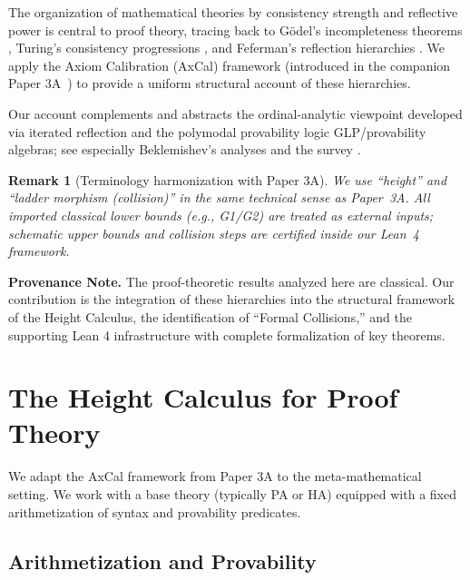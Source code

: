 \documentclass[11pt]{article}
\newtheorem{remark}[theorem]{Remark}
\begin{document}
The organization of mathematical theories by consistency strength and reflective power is central to proof theory, tracing back to Gödel's incompleteness theorems \cite{Godel1931}, Turing's consistency progressions \cite{Turing1939}, and Feferman's reflection hierarchies \cite{Feferman1962}. We apply the Axiom Calibration (AxCal) framework (introduced in the companion Paper 3A~\cite{LeeAxCal2025}) to provide a uniform structural account of these hierarchies.

Our account complements and abstracts the ordinal-analytic viewpoint developed via iterated reflection and the polymodal provability logic GLP/provability algebras; see especially Beklemishev's analyses \cite{Beklemishev2003,Beklemishev2004} and the survey \cite{ArtemovBeklemishev2004}.

\begin{remark}[Terminology harmonization with Paper 3A]
We use ``height'' and ``ladder morphism (collision)'' in the same technical sense as Paper~3A. All imported classical lower bounds (e.g., G1/G2) are treated as external inputs; schematic upper bounds and collision steps are certified inside our Lean~4 framework.
\end{remark}

\begin{mdframed}[style=provenance]
\textbf{Provenance Note.} The proof-theoretic results analyzed here are classical. Our contribution is the integration of these hierarchies into the structural framework of the Height Calculus, the identification of ``Formal Collisions,'' and the supporting Lean 4 infrastructure with complete formalization of key theorems.
\end{mdframed}

\section{The Height Calculus for Proof Theory}

We adapt the AxCal framework from Paper 3A to the meta-mathematical setting. We work with a base theory (typically PA or HA) equipped with a fixed arithmetization of syntax and provability predicates.

\subsection{Arithmetization and Provability}
\end{document}
